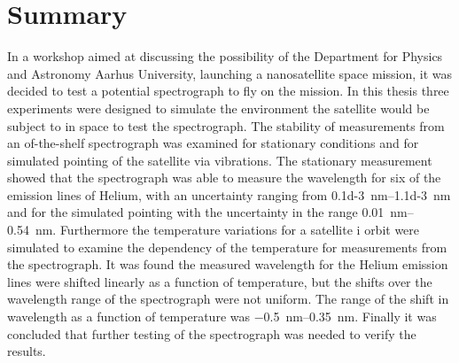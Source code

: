 \vspace{6cm}
\chapter*{Summary}

In a workshop aimed at discussing the possibility of the Department for Physics and Astronomy Aarhus University, launching a nanosatellite space mission, it was decided to test a potential spectrograph to fly on the mission. In this thesis three experiments were designed to simulate the environment the satellite would be subject to in space to test the spectrograph. The stability of measurements from an of-the-shelf spectrograph was examined for stationary conditions and for simulated pointing of the satellite via vibrations. The stationary measurement showed that the spectrograph was able to measure the wavelength for six of the emission lines of Helium, with an uncertainty ranging from \SIrange{0.1d-3}{1.1d-3}{\nano\meter} and for the simulated pointing with the uncertainty in the range \SIrange{0,01}{0,54}{\nano\meter}. Furthermore the temperature variations for a satellite i orbit were simulated to examine the dependency of the temperature for measurements from the spectrograph. It was found the measured wavelength for the Helium emission lines were shifted linearly as a function of temperature, but the shifts over the wavelength range of the spectrograph were not uniform. The range of the shift in wavelength as a function of temperature was \SIrange{-0,5}{0,35}{\nano\meter}. Finally it was concluded that further testing of the spectrograph was needed to verify the results.